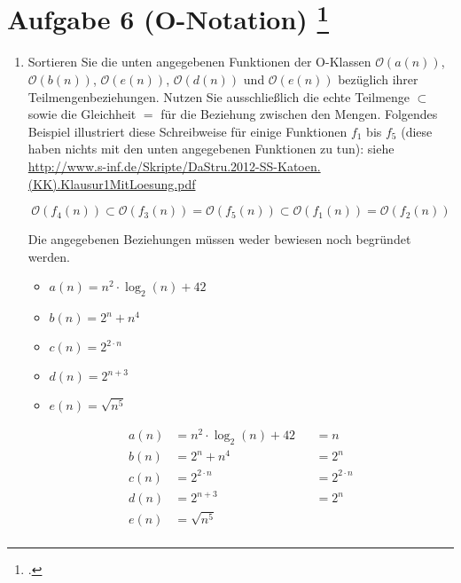 \documentclass{lehramt-informatik-aufgabe}
\begin{document}
\section{Aufgabe 6 (O-Notation)
\footcite{66115:2019:09}}

\begin{enumerate}


\item Sortieren Sie die unten angegebenen Funktionen der O-Klassen
$\mathcal{O}(a(n))$, $\mathcal{O}(b(n))$, $\mathcal{O}(e(n))$,
$\mathcal{O}(d(n))$ und $\mathcal{O}(e(n))$ bezüglich ihrer
Teilmengenbeziehungen. Nutzen Sie ausschließlich die echte Teilmenge
$\subset$ sowie die Gleichheit $=$ für die Beziehung zwischen den
Mengen. Folgendes Beispiel illustriert diese Schreibweise für einige
Funktionen $f_1$ bis $f_5$ (diese haben nichts mit den unten angegebenen
Funktionen zu tun): siehe
\url{http://www.s-inf.de/Skripte/DaStru.2012-SS-Katoen.(KK).Klausur1MitLoesung.pdf}

\begin{displaymath}
\mathcal{O}(f_4 (n)) \subset \mathcal{O}(f_3(n)) = \mathcal{O}(f_5(n)) \subset \mathcal{O}(f_1(n)) = \mathcal{O}(f_2(n))
\end{displaymath}

Die angegebenen Beziehungen müssen weder bewiesen noch begründet werden.

\begin{itemize}
\item $a(n) = n^2 \cdot \log_2(n) + 42$
\item $b(n) = 2^n + n^4$
\item $c(n) = 2^{2 \cdot n}$
\item $d(n) = 2^{n+3}$
\item $e(n) = \sqrt{n^5}$
\end{itemize}

\begin{liAntwort}
\begin{align*}
a(n) &= n^2 \cdot \log_2(n) + 42 &&= n\\
b(n) &= 2^n + n^4 &&= 2^n\\
c(n) &= 2^{2 \cdot n} &&=2^{2 \cdot n}\\
d(n) &= 2^{n+3} &&= 2^n\\
e(n) &= \sqrt{n^5}\\
\end{align*}


\end{liAntwort}
\end{enumerate}
\end{document}
